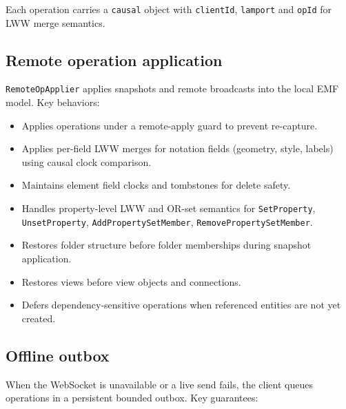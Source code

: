 Each operation carries a \texttt{causal} object with \texttt{clientId},
\texttt{lamport} and \texttt{opId} for LWW merge semantics.

\subsection{Remote operation application}

\texttt{RemoteOpApplier} applies snapshots and remote broadcasts into the
local EMF model. Key behaviors:

\begin{itemize}
\item Applies operations under a remote-apply guard to prevent re-capture.
\item Applies per-field LWW merges for notation fields (geometry, style,
  labels) using causal clock comparison.
\item Maintains element field clocks and tombstones for delete safety.
\item Handles property-level LWW and OR-set semantics for
  \texttt{SetProperty}, \texttt{UnsetProperty},
  \texttt{AddPropertySetMember}, \texttt{RemovePropertySetMember}.
\item Restores folder structure before folder memberships during snapshot
  application.
\item Restores views before view objects and connections.
\item Defers dependency-sensitive operations when referenced entities are not
  yet created.
\end{itemize}

\subsection{Offline outbox}

When the WebSocket is unavailable or a live send fails, the client queues
operations in a persistent bounded outbox. Key guarantees:

